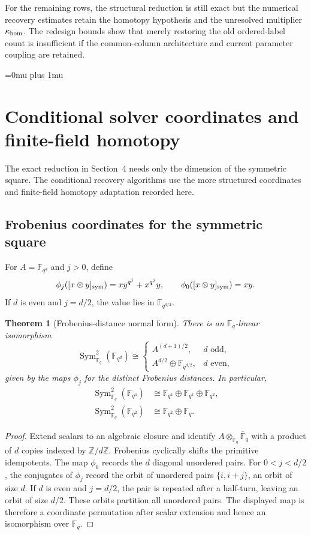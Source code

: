 \documentclass[11pt]{article}
\newtheorem{theorem}{Theorem}[section]
\newcommand{\F}{\mathbb F}
\newcommand{\Sym}{\operatorname{Sym}}
\begin{document}
For the remaining rows, the structural reduction is still exact but the
numerical recovery estimates retain the homotopy hypothesis and the unresolved
multiplier $\kappa_{\rm hom}$.  The redesign bounds show that merely restoring
the old ordered-label count is insufficient if the common-column architecture
and current parameter coupling are retained.

\clearpage

\begingroup
\footnotesize
\setlength{\bibsep}{0pt}
\Urlmuskip=0mu plus 1mu\relax
\sloppy

\endgroup

\clearpage
\appendix
\section{Conditional solver coordinates and finite-field homotopy}
\label{app:conditional-solver}

The exact reduction in Section~4 needs only the dimension of the symmetric
square.  The conditional recovery algorithms use the more structured
coordinates and finite-field homotopy adaptation recorded here.

\subsection{Frobenius coordinates for the symmetric square}
For $A=\F_{q^d}$ and $j>0$, define
\[
 \phi_j([x\otimes y]_{\rm sym})=xy^{q^j}+x^{q^j}y,
 \qquad
 \phi_0([x\otimes y]_{\rm sym})=xy.
\]
If $d$ is even and $j=d/2$, the value lies in $\F_{q^{d/2}}$.

\begin{theorem}[Frobenius-distance normal form]\label{thm:frobenius-normal}
There is an $\F_q$-linear isomorphism
\[
 \Sym^2_{\F_q}(\F_{q^d})\cong
 \begin{cases}
   A^{(d+1)/2},& d\text{ odd},\\
   A^{d/2}\oplus\F_{q^{d/2}},& d\text{ even},
 \end{cases}
\]
given by the maps $\phi_j$ for the distinct Frobenius distances.  In
particular,
\begin{align}
 \Sym^2_{\F_q}(\F_{q^4})&\cong
    \F_{q^4}\oplus\F_{q^4}\oplus\F_{q^2},            \label{eq:l4-channels}\\
 \Sym^2_{\F_q}(\F_{q^2})&\cong
    \F_{q^2}\oplus\F_q.                              \label{eq:l2-channels}
\end{align}
\end{theorem}

\begin{proof}
Extend scalars to an algebraic closure and identify
$A\otimes_{\F_q}\overline{\F}_q$ with a product of $d$ copies indexed by
$\mathbb Z/d\mathbb Z$.  Frobenius cyclically shifts the primitive
idempotents.  The map $\phi_0$ records the $d$ diagonal unordered pairs.
For $0<j<d/2$, the conjugates of $\phi_j$ record the orbit of unordered pairs
$\{i,i+j\}$, an orbit of size $d$.  If $d$ is even and $j=d/2$, the pair is
repeated after a half-turn, leaving an orbit of size $d/2$.  These orbits
partition all unordered pairs.  The displayed map is therefore a coordinate
permutation after scalar extension and hence an isomorphism over $\F_q$.
\end{proof}
\end{document}
